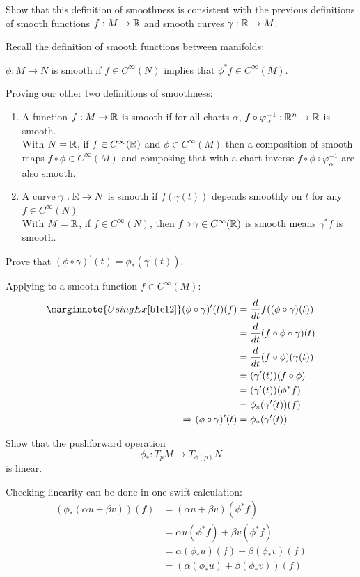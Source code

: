 \documentclass[10pt]{article}
\begin{document}
\begin{example}
	Show that this definition of smoothness is consistent with the previous definitions
	of smooth functions $f:M\to \mathbb{R}$ and smooth curves $\gamma:\mathbb{R} \to M$.
\end{example}
\sol Recall the definition of smooth functions between manifolds:
\begin{center}
	$\phi:M\to N$ is smooth if $f \in C^\infty(N)$ implies that $\phi^*f\in C^\infty(M)$.
\end{center}
Proving our other two definitions of smoothness:
\begin{enumerate}
	\item A function $f:M\to\mathbb{R}$ is smooth if for all charts $\alpha$, $f \circ \varphi^{-1}_\alpha:\mathbb{R}^n\to\mathbb{R}$ is smooth.\\
	With $N=\mathbb{R}$, if $f \in C^\infty(\mathbb{R})$ and $\phi \in C^\infty(M)$ then a composition of smooth maps $f \circ \phi \in C^\infty(M)$ and composing that with a chart inverse $f \circ \phi \circ \varphi^{-1}_\alpha$ are also smooth. 
	\item A curve $\gamma:\mathbb{R} \to N$ is smooth if $f(\gamma(t))$ depends smoothly on $t$ for any $f \in C^\infty(N)$\\
	With $M=\mathbb{R}$, if $f \in C^\infty(N)$, then $f \circ \gamma \in C^\infty(\mathbb{R})$ is smooth means $\gamma^*f$ is smooth.
\end{enumerate}



\begin{example}
	Prove that $(\phi \circ \gamma)^\prime(t) = \phi_*(\gamma^\prime(t))$.
\end{example}
\sol Applying to a smooth function $f \in C^\infty(M)$:
$$
\begin{aligned}
	\marginnote{Using Ex \ref{b1e12}}(\phi \circ \gamma)^\prime(t)(f) &= \frac{d}{dt}f((\phi \circ \gamma)(t))\\
	&= \frac{d}{dt}(f \circ \phi \circ \gamma)(t)\\
	&= \frac{d}{dt}(f \circ \phi)(\gamma(t))\\
	&= (\gamma^\prime(t))(f \circ \phi)\\
	&= (\gamma^\prime(t))(\phi^* f)\\
	&= \phi_*(\gamma^\prime(t))(f)\\
	\Rightarrow (\phi \circ \gamma)^\prime(t) &= \phi_*(\gamma^\prime(t))
\end{aligned}
$$

\begin{example}
	Show that the pushforward operation
	$$
		\phi_*:T_pM\to T_{\phi(p)}N
	$$
	is linear.
\end{example}
\sol Checking linearity can be done in one swift calculation:
$$
	\begin{aligned}
		(\phi_*(\alpha u+\beta v))(f) &= (\alpha u+\beta v)(\phi^*f)\\
		&= \alpha u(\phi^*f)+\beta v(\phi^*f)\\
		&= \alpha (\phi_*u)(f)+\beta (\phi_*v)(f)\\
		&= (\alpha (\phi_*u)+\beta (\phi_*v))(f)\\
	\end{aligned}
$$
\end{document}
